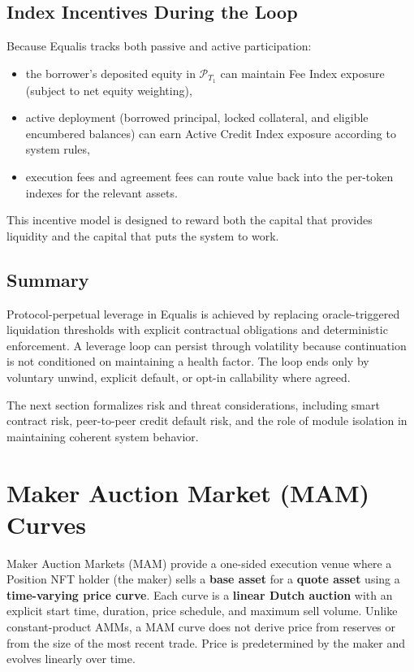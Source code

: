 \documentclass[version=preprint]{iacrcc}
\begin{document}
\subsection{Index Incentives During the Loop}

Because Equalis tracks both passive and active participation:
\begin{itemize}
  \item the borrower’s deposited equity in $\mathcal{P}_{T_1}$ can maintain Fee Index exposure (subject to net equity weighting),
  \item active deployment (borrowed principal, locked collateral, and eligible encumbered balances) can earn Active Credit Index exposure according to system rules,
  \item execution fees and agreement fees can route value back into the per-token indexes for the relevant assets.
\end{itemize}

This incentive model is designed to reward both the capital that provides liquidity and the capital that puts the system to work.

\subsection{Summary}

Protocol-perpetual leverage in Equalis is achieved by replacing oracle-triggered liquidation thresholds with explicit contractual obligations and deterministic enforcement. A leverage loop can persist through volatility because continuation is not conditioned on maintaining a health factor. The loop ends only by voluntary unwind, explicit default, or opt-in callability where agreed.

The next section formalizes risk and threat considerations, including smart contract risk, peer-to-peer credit default risk, and the role of module isolation in maintaining coherent system behavior.


\section{Maker Auction Market (MAM) Curves}

Maker Auction Markets (MAM) provide a one-sided execution venue where a Position NFT holder (the maker) sells a \textbf{base asset} for a \textbf{quote asset} using a \textbf{time-varying price curve}. Each curve is a \textbf{linear Dutch auction} with an explicit start time, duration, price schedule, and maximum sell volume. Unlike constant-product AMMs, a MAM curve does not derive price from reserves or from the size of the most recent trade. Price is predetermined by the maker and evolves linearly over time.
\end{document}
